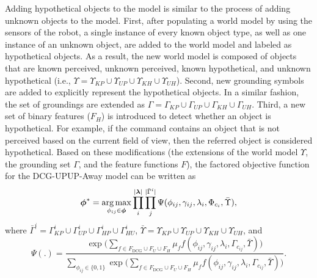 Adding hypothetical objects to the model is similar to the process of adding unknown objects to the model. First, after populating a world model by using the sensors of the robot, a single instance of every known object type, as well as one instance of an unknown object, are added to the world model and labeled as hypothetical objects. As a result, the new world model is composed of objects that are known perceived, unknown perceived, known hypothetical, and unknown hypothetical (i.e., $\Upsilon = \Upsilon_{KP} \cup \Upsilon_{UP} \cup \Upsilon_{KH} \cup \Upsilon_{UH}$). Second, new grounding symbols are added to explicitly represent the hypothetical objects. In a similar fashion, the set of groundings are extended as $\Gamma = \Gamma_{KP} \cup \Gamma_{UP} \cup \Gamma_{KH} \cup \Gamma_{UH}$. Third, a new set of binary features ($F_H$) is introduced to detect whether an object is hypothetical. For example, if the command contains an object that is not perceived based on the current field of view, then the referred object is considered hypothetical. Based on these modifications (the extensions of the world model $\Upsilon$, the grounding set $\Gamma$, and the feature functions $F$), the factored objective function for the DCG-UPUP-Away model can be written as
\begin{equation}
\boldsymbol{\phi}^* = \operatorname*{\arg\max}_{\phi_{ij} \in \boldsymbol{\phi}} \prod_{i}^{|\boldsymbol\lambda|} \prod_j^{|\bar\Gamma^i|} \Psi(\phi_{ij},\gamma_{ij},\lambda_i,\Phi_{c_{i}},\bar\Upsilon),
\label{eq:dcg_upup_away_llm1}
\end{equation}
where ${\bar{\Gamma}^i = \Gamma^i_{KP} \cup \Gamma^i_{UP} \cup \Gamma^i_{HP} \cup \Gamma^i_{HU}}$, $\bar\Upsilon = \Upsilon_{KP} \cup \Upsilon_{UP} \cup \Upsilon_{KH} \cup \Upsilon_{UH}$, and 
\begin{equation}
\Psi(.) = \frac{\exp \Big( \sum\limits_{f \in F_{\text{DCG}} \cup F_{U} \cup F_{H}} \mu_f f(\phi_{ij},\gamma_{ij},\lambda_i,\Gamma_{c_{ij}},\bar\Upsilon) \Big)}{\sum\limits_{\phi_{ij} \in \{0,1\}}\exp \Big( \sum\limits_{f \in F_{\text{DCG}} \cup F_{U} \cup F_{H}} \mu_f f(\phi_{ij},\gamma_{ij},\lambda_i,\Gamma_{c_{ij}},\bar\Upsilon) \Big)}.
\label{eq:dcg_upup_away_factor}
\end{equation}
